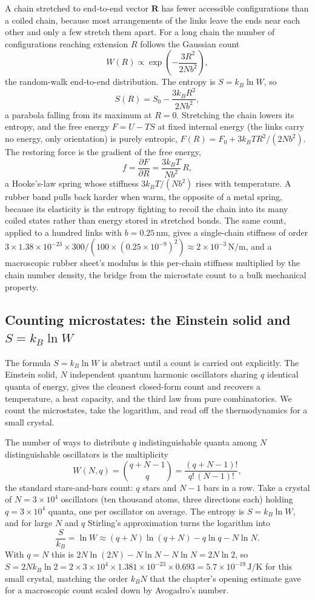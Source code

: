 A chain stretched to end-to-end vector $\mathbf{R}$ has fewer accessible
configurations than a coiled chain, because most arrangements of the links
leave the ends near each other and only a few stretch them apart. For a
long chain the number of configurations reaching extension $R$ follows the
Gaussian count
\[
W(R) \propto \exp\!\left(-\frac{3R^2}{2N b^2}\right),
\]
the random-walk end-to-end distribution. The entropy is $S = k_B \ln W$,
so
\[
S(R) = S_0 - \frac{3 k_B R^2}{2 N b^2},
\]
a parabola falling from its maximum at $R = 0$. Stretching the chain
lowers its entropy, and the free energy $F = U - TS$ at fixed internal
energy (the links carry no energy, only orientation) is purely entropic,
$F(R) = F_0 + 3 k_B T R^2/(2 N b^2)$. The restoring force is the gradient
of the free energy,
\[
f = \frac{\partial F}{\partial R} = \frac{3 k_B T}{N b^2}\,R,
\]
a Hooke's-law spring whose stiffness $3 k_B T/(N b^2)$ rises with
temperature. A rubber band pulls back harder when warm, the opposite of a
metal spring, because its elasticity is the entropy fighting to recoil the
chain into its many coiled states rather than energy stored in stretched
bonds. The same count, applied to a hundred links with $b =
0.25\,\text{nm}$, gives a single-chain stiffness of order $3 \times 1.38
\times 10^{-23} \times 300/(100 \times (0.25\times10^{-9})^2) \approx 2
\times 10^{-3}\,\text{N}/\text{m}$, and a macroscopic rubber sheet's
modulus is this per-chain stiffness multiplied by the chain number
density, the bridge from the microstate count to a bulk mechanical
property.

\subsection{Counting microstates: the Einstein solid and $S = k_B \ln W$}

The formula $S = k_B \ln W$ is abstract until a count is carried out
explicitly. The Einstein solid, $N$ independent quantum harmonic oscillators
sharing $q$ identical quanta of energy, gives the cleanest closed-form count and
recovers a temperature, a heat capacity, and the third law from pure
combinatorics. We count the microstates, take the logarithm, and read off the
thermodynamics for a small crystal.

The number of ways to distribute $q$ indistinguishable quanta among $N$
distinguishable oscillators is the multiplicity
\[
W(N, q) = \binom{q + N - 1}{q}
= \frac{(q + N - 1)!}{q!\,(N-1)!},
\]
the standard stars-and-bars count: $q$ stars and $N-1$ bars in a row. Take a
crystal of $N = 3 \times 10^{4}$ oscillators (ten thousand atoms, three
directions each) holding $q = 3 \times 10^{4}$ quanta, one per oscillator on
average. The entropy is $S = k_B \ln W$, and for large $N$ and $q$ Stirling's
approximation turns the logarithm into
\[
\frac{S}{k_B} = \ln W \approx (q+N)\ln(q+N) - q\ln q - N\ln N.
\]
With $q = N$ this is $2N\ln(2N) - N\ln N - N\ln N = 2N\ln 2$, so
$S = 2N k_B \ln 2 = 2 \times 3\times10^4 \times 1.381\times10^{-23} \times
0.693 = 5.7\times10^{-19}\,\si{\joule\per\kelvin}$ for this small crystal,
matching the order $k_B N$ that the chapter's opening estimate gave for a
macroscopic count scaled down by Avogadro's number.

